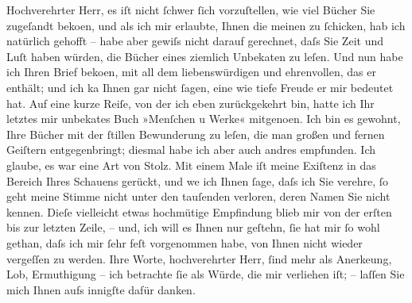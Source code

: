 \pstart\center{}Hochverehrter Herr,\pend\vspace{0.5em}
\pstart
           es iſt nicht ſchwer ſich vorzuſtellen, wie viel Bücher Sie zugeſandt beko{\geminationm}en, und als ich mir erlaubte, Ihnen die meinen zu ſchicken,
               hab ich natürlich gehofft – habe aber gewiſs nicht darauf gerechnet, daſs Sie Zeit
               und Luſt haben würden, die Bücher eines ziemlich Unbeka{\geminationn}ten zu leſen. Und nun habe ich Ihren Brief beko{\geminationm}en,
               mit all dem liebens{\pb}würdigen und ehrenvollen, das
               er enthält; und ich ka{\geminationn} Ihnen gar nicht ſagen, eine wie
               tiefe Freude er mir bedeutet hat. Auf eine kurze Reiſe, von der ich eben
               zurückgekehrt bin, hatte ich Ihr letztes mir unbeka{\geminationn}tes
               Buch »Menſchen u Werke« mitgeno{\geminationm}en. Ich bin es gewohnt, Ihre Bücher mit der ſtillen
               Bewunderung zu leſen, die man großen und fernen Geiſtern entgegen{\pb}bringt; diesmal habe ich aber auch andres
               empfunden. Ich glaube, es war eine Art von Stolz. Mit einem Male iſt meine Exiſtenz
               in das Bereich Ihres Schauens gerückt, und we{\geminationn} ich Ihnen
               ſage, daſs ich Sie verehre, ſo geht meine Stimme nicht unter den tauſenden verloren,
               deren Namen Sie nicht kennen. Dieſe vielleicht etwas hochmütige Empfindung blieb mir
                  {\pb}von der erſten bis zur letzten Zeile, – und,
               ich will es Ihnen nur geſtehn, ſie hat mir ſo wohl gethan, daſs ich mir ſehr feſt
               vorgenommen habe, von Ihnen nicht wieder vergeſſen zu werden. Ihre Worte,
               hochverehrter Herr, ſind mehr als Anerke{\geminationn}ung, Lob,
               Ermuthigung – ich betrachte ſie als Würde, die mir verliehen iſt; – laſſen Sie mich
               Ihnen aufs innigſte dafür {\pb}danken.\pend
           
